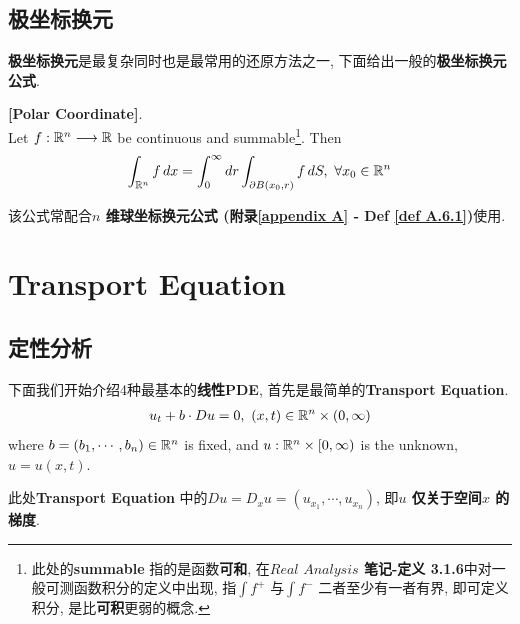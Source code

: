 \newpage

\subsection{极坐标换元}
	\textbf{极坐标换元}是最复杂同时也是最常用的还原方法之一, 下面给出一般的\textbf{极坐标换元公式}.
	\begin{thm}\label{thm 1.6.4}
		\textbf{[Polar Coordinate]}. \\
		Let $f : \mathbb{R}^n \longrightarrow \mathbb{R}$ be continuous and summable\footnote{此处的\textbf{summable} 指的是函数\textbf{可和}, 在\textbf{$Real \,\, Analysis$ 笔记-定义 3.1.6}中对一般可测函数积分的定义中出现, 指$\int f^+$ 与$\int f^-$ 二者至少有一者有界, 即可定义积分, 是比\textbf{可积}更弱的概念.}. Then
		\begin{align}
			\int_{\mathbb{R}^n} f \, dx = \int_{0}^{\infty} dr \int_{\partial B(x_0 , r)} f \, dS , \,\, \forall x_0 \in \mathbb{R}^n
		\end{align}
		
		\vspace{4em}
		
		\begin{rmk}
			该公式常配合\textbf{$n$ 维球坐标换元公式 (附录\ref{appendix A} - Def \ref{def A.6.1})}使用.
		\end{rmk}
	\end{thm}

\newpage

\section{Transport Equation}
\subsection{定性分析}
	下面我们开始介绍4种最基本的\textbf{线性PDE}, 首先是最简单的\textbf{Transport Equation}. 
	\begin{align}
		u_t + b \cdot Du = 0 , \,\, (x , t) \in \mathbb{R}^n \times (0 , \infty)
	\end{align}
	where $b = (b_1 , \cdots , b_n) \in \mathbb{R}^n$ is fixed, and $u : \mathbb{R}^n \times [0 , \infty)$ is the unknown, $u = u(x , t)$. 
	
	\vspace*{2em}
	
	\begin{rmk}
		此处\textbf{Transport Equation} 中的$Du = D_{x}u = (u_{x_1} , \cdots , u_{x_n})$, 即\textbf{$u$ 仅关于空间$x$ 的梯度}.
	\end{rmk}
	
